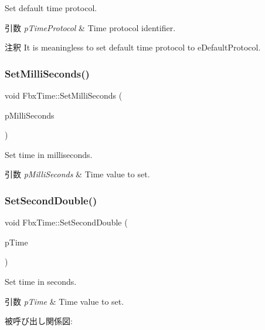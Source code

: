 Set default time protocol. 
\begin{DoxyParams}{引数}
{\em p\+Time\+Protocol} & Time protocol identifier. \\
\hline
\end{DoxyParams}
\begin{DoxyRemark}{注釈}
It is meaningless to set default time protocol to {\ttfamily e\+Default\+Protocol}. 
\end{DoxyRemark}
\mbox{\label{class_fbx_time_a7105d8b5b0665d82660f5ef749cd6274}} 
\subsubsection{\texorpdfstring{Set\+Milli\+Seconds()}{SetMilliSeconds()}}
{\footnotesize\ttfamily void Fbx\+Time\+::\+Set\+Milli\+Seconds (\begin{DoxyParamCaption}\item[{\hyperlink{fbxtypes_8h_ac34da60c22b0a7e1156e5480da7d71f1}{Fbx\+Long\+Long}}]{p\+Milli\+Seconds }\end{DoxyParamCaption})}

Set time in milliseconds. 
\begin{DoxyParams}{引数}
{\em p\+Milli\+Seconds} & Time value to set. \\
\hline
\end{DoxyParams}
\mbox{\label{class_fbx_time_aa67980a4f73f7914d0c457384754da0c}} 
\subsubsection{\texorpdfstring{Set\+Second\+Double()}{SetSecondDouble()}}
{\footnotesize\ttfamily void Fbx\+Time\+::\+Set\+Second\+Double (\begin{DoxyParamCaption}\item[{double}]{p\+Time }\end{DoxyParamCaption})}

Set time in seconds. 
\begin{DoxyParams}{引数}
{\em p\+Time} & Time value to set. \\
\hline
\end{DoxyParams}
被呼び出し関係図\+:
\mbox{\label{class_fbx_time_ae57387b2c14de574b1b7d4361babf033}} 
